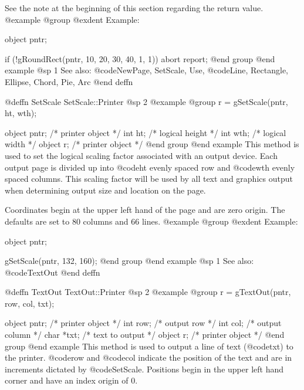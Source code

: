 See the note at the beginning of this section regarding the return value.
@example
@group
@exdent Example:

object  pntr;

if (!gRoundRect(pntr, 10, 20, 30, 40, 1, 1))
        abort report;
@end group
@end example
@sp 1
See also:  @code{NewPage, SetScale, Use,}
        @code{Line, Rectangle, Ellipse, Chord, Pie, Arc}
@end deffn
















@deffn {SetScale} SetScale::Printer
@sp 2
@example
@group
r = gSetScale(pntr, ht, wth);

object  pntr;   /*  printer object  */
int     ht;     /*  logical height  */
int     wth;    /*  logical width   */
object  r;      /*  printer object  */
@end group
@end example
This method is used to set the logical scaling factor associated with an
output device.  Each output page is divided up into @code{ht} evenly
spaced row and @code{wth} evenly spaced columns.  This scaling factor
will be used by all text and graphics output when determining output size
and location on the page.

Coordinates begin at the upper left hand of the page and are zero origin.
The defaults are set to 80 columns and 66 lines.
@example
@group
@exdent Example:

object  pntr;

gSetScale(pntr, 132, 160);
@end group
@end example
@sp 1
See also:  @code{TextOut}
@end deffn












@deffn {TextOut} TextOut::Printer
@sp 2
@example
@group
r = gTextOut(pntr, row, col, txt); 

object  pntr;   /*  printer object  */
int     row;    /*  output row      */
int     col;    /*  output column   */
char    *txt;   /*  text to output  */
object  r;      /*  printer object  */
@end group
@end example
This method is used to output a line of text (@code{txt}) to the printer.
@code{row} and @code{col} indicate the position of the text and are in
increments dictated by @code{SetScale}.  Positions begin in the upper
left hand corner and have an index origin of 0.

